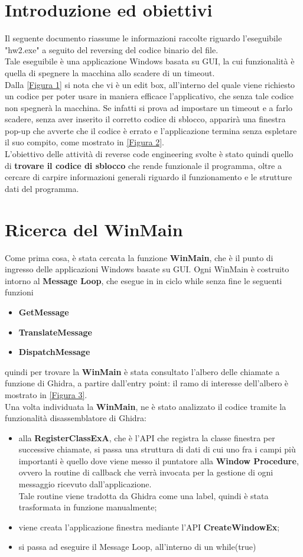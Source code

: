 \documentclass[12pt]{extarticle}
\begin{document}
\section{Introduzione ed obiettivi}
Il seguente documento riassume le informazioni raccolte riguardo l'eseguibile "hw2.exe" a seguito del reversing del codice binario del file.\\Tale eseguibile è una applicazione Windows basata su GUI, la cui funzionalità è quella di spegnere la macchina allo scadere di un timeout.\\Dalla \ref{Figura 1} si nota che vi è un edit box, all'interno del quale viene richiesto un codice per poter usare in maniera efficace l'applicativo, che senza tale codice non spegnerà la macchina. Se infatti si prova ad impostare un timeout e a farlo scadere, senza aver inserito il corretto codice di sblocco, apparirà una finestra pop-up che avverte che il codice è errato e l'applicazione termina senza espletare il suo compito, come mostrato in \ref{Figura 2}.\\L'obiettivo delle attività di reverse code engineering svolte è stato quindi quello di \textbf{trovare il codice di sblocco} che rende funzionale il programma, oltre a cercare di carpire informazioni generali riguardo il funzionamento e le strutture dati del programma.
\section{Ricerca del WinMain}
Come prima cosa, è stata cercata la funzione \textbf{WinMain}, che è il punto di ingresso delle applicazioni Windows basate su GUI. Ogni WinMain è costruito intorno al \textbf{Message Loop}, che esegue in in ciclo while senza fine le seguenti funzioni
\begin{itemize}
\item \textbf{GetMessage}
\item \textbf{TranslateMessage}
\item \textbf{DispatchMessage}
\end{itemize}
quindi per trovare la \textbf{WinMain} è stata consultato l'albero delle chiamate a funzione di Ghidra, a partire dall'entry point: il ramo di interesse dell'albero è mostrato in \ref{Figura 3}.\\Una volta individuata la \textbf{WinMain}, ne è stato analizzato il codice tramite la funzionalità disassemblatore di Ghidra:
\begin{itemize}
\item alla \textbf{RegisterClassExA}, che è l'API che registra la classe finestra per successive chiamate, si passa una struttura di dati di cui uno fra i campi più importanti è quello dove viene messo il puntatore alla \textbf{Window Procedure}, ovvero la routine di callback che verrà invocata per la gestione di ogni messaggio ricevuto dall'applicazione.\\Tale routine viene tradotta da Ghidra come una label, quindi è stata trasformata in funzione manualmente;
\item viene creata l'applicazione finestra mediante l'API \textbf{CreateWindowEx};
\item si passa ad eseguire il Message Loop, all'interno di un \textsf{while(true)}
\end{itemize}
\end{document}
